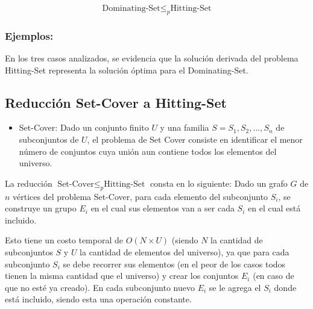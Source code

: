 \[\text{Dominating-Set}  \leq _{p} \text{Hitting-Set}\]

\subsubsection{Ejemplos:} 






En los tres casos analizados, se evidencia que la solución derivada del problema Hitting-Set representa la solución óptima para el Dominating-Set.


\subsection{Reducción Set-Cover a Hitting-Set}

\begin{itemize}
    \item Set-Cover: Dado un conjunto finito $U$ y una familia $S= {S_1, S_2, ..., S_n}$ de subconjuntos de $U$, el problema de Set Cover consiste en identificar el menor número de conjuntos cuya unión aun contiene todos los elementos del universo. 
\end{itemize}

La reducción $\text{Set-Cover} \leq_{p} \text{Hitting-Set}$ consta en lo siguiente:
Dado un grafo $G$ de $n$ vértices del problema Set-Cover, para cada elemento del subconjunto $S_{i}$, se construye un grupo $E_{i}$ en el cual sus elementos van a ser cada $S_i$ en el cual está incluido. 

Esto tiene un costo temporal de $O(N \times U)$ (siendo $N$ la cantidad de subconjuntos $S$ y $U$ la cantidad de elementos del universo), ya que para cada subconjunto $S_{i}$ se debe recorrer sus elementos (en el peor de los casos todos tienen la misma cantidad que el universo) y crear los conjuntos $E_{i}$ (en caso de que no esté ya creado). En cada subconjunto nuevo $E_i$ se le agrega el $S_i$ donde está incluido, siendo esta una operación constante. 

